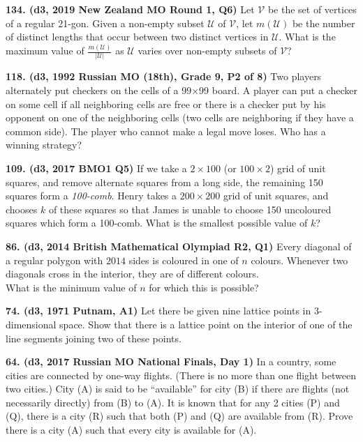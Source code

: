 \documentclass{article}
\begin{document}
        \textbf{134. (\color{red}d3\color{black}, 2019 New Zealand MO Round 1, Q6)} Let \(\mathcal{V}\) be the set of vertices of a regular 21-gon. Given a non-empty subset \(\mathcal{U}\) of \(\mathcal{V}\), let \(m(\mathcal{U})\) be the number of distinct lengths that occur between two distinct vertices in \(\mathcal{U}\). What is the maximum value of \(\frac{m(\mathcal{U})}{\vert \mathcal{U} \vert}\) as \(\mathcal{U}\) varies over non-empty subsets of \(\mathcal{V}\)?

        \textbf{118. (\color{red}d3\color{black}, 1992 Russian MO (18th), Grade 9, P2 of 8)} Two players alternately put checkers on the cells of a 99×99 board. A player can put a checker on some cell if all neighboring cells are free or there is a checker put by his opponent on one of the neighboring cells (two cells are neighboring if they have a common side). The player who cannot make a legal move loses. Who has a winning strategy?

        \textbf{109. (\color{red}d3\color{black}, 2017 BMO1 Q5)} If we take a \(2 \times 100\) (or \(100 \times 2\)) grid of unit squares, and remove alternate squares from a long side, the remaining 150 squares form a \textit{100-comb}. Henry takes a \(200 \times 200\) grid of unit squares, and chooses \(k\) of these squares so that James is unable to choose 150 uncoloured squares which form a 100-comb. What is the smallest possible value of \(k\)?

        \textbf{86. (\color{red}d3\color{black}, 2014 British Mathematical Olympiad R2, Q1)} Every diagonal of a regular polygon with $2014$ sides is coloured in one of $n$ colours. Whenever two diagonals cross in the interior, they are of different colours. \\

        What is the minimum value of $n$ for which this is possible?

        \textbf{74. (\color{red}d3\color{black}, 1971 Putnam, A1)} Let there be given nine lattice points in 3-dimensional space. Show that there is a lattice point on the interior of one of the line segments joining two of these points.

        \textbf{64. (\color{red}d3\color{black}, 2017 Russian MO National Finals, Day 1)} In a country, some cities are connected by one-way flights. (There is no more than one flight between two cities.) City (A) is said to be ``available'' for city (B) if there are flights (not necessarily directly) from (B) to (A). It is known that for any 2 cities (P) and (Q), there is a city (R) such that both (P) and (Q) are available from (R). Prove there is a city (A) such that every city is available for (A).
\end{document}

